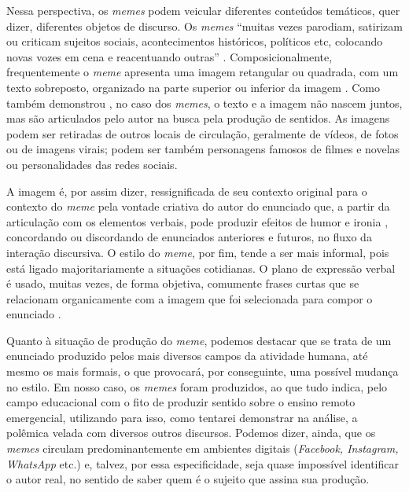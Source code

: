 \documentclass[portuguese]{textolivre}
\begin{document}
Nessa perspectiva, os \textit{memes} podem veicular diferentes conteúdos temáticos, quer dizer, diferentes objetos de discurso. Os \textit{memes} “muitas vezes parodiam, satirizam ou criticam sujeitos sociais, acontecimentos históricos, políticos etc, colocando novas vozes em cena e reacentuando outras” \cite[p. 191]{lara2020meme}. Composicionalmente, frequentemente o \textit{meme} apresenta uma imagem retangular ou quadrada, com um texto sobreposto, organizado na parte superior ou inferior da imagem \cite{lara2020meme}. Como também demonstrou \textcite{lima2022reflexao}, no caso dos \textit{memes}, o texto e a imagem não nascem juntos, mas são articulados pelo autor na busca pela produção de sentidos. As imagens podem ser retiradas de outros locais de circulação, geralmente de vídeos, de fotos ou de imagens virais; podem ser também personagens famosos de filmes e novelas ou personalidades das redes sociais.
	
A imagem é, por assim dizer, ressignificada de seu contexto original para o contexto do \textit{meme} pela vontade criativa do autor do enunciado que, a partir da articulação com os elementos verbais, pode produzir efeitos de humor e ironia \cite{silva2016memes}, concordando ou discordando de enunciados anteriores e futuros, no fluxo da interação discursiva. O estilo do \textit{meme}, por fim, tende a ser mais informal, pois está ligado majoritariamente a situações cotidianas. O plano de expressão verbal é usado, muitas vezes, de forma objetiva, comumente frases curtas que se relacionam organicamente com a imagem que foi selecionada para compor o enunciado \cite{lara2020meme}.
	
Quanto à situação de produção do \textit{meme}, podemos destacar que se trata de um enunciado produzido pelos mais diversos campos da atividade humana, até mesmo os mais formais, o que provocará, por conseguinte, uma possível mudança no estilo. Em nosso caso, os \textit{memes} foram produzidos, ao que tudo indica, pelo campo educacional com o fito de produzir sentido sobre o ensino remoto emergencial, utilizando para isso, como tentarei demonstrar na análise, a polêmica velada com diversos outros discursos. Podemos dizer, ainda, que os \textit{memes} circulam predominantemente em ambientes digitais (\textit{Facebook, Instagram, WhatsApp} etc.) e, talvez, por essa especificidade, seja quase impossível identificar o autor real, no sentido de saber quem é o sujeito que assina sua produção.
	
\end{document}
